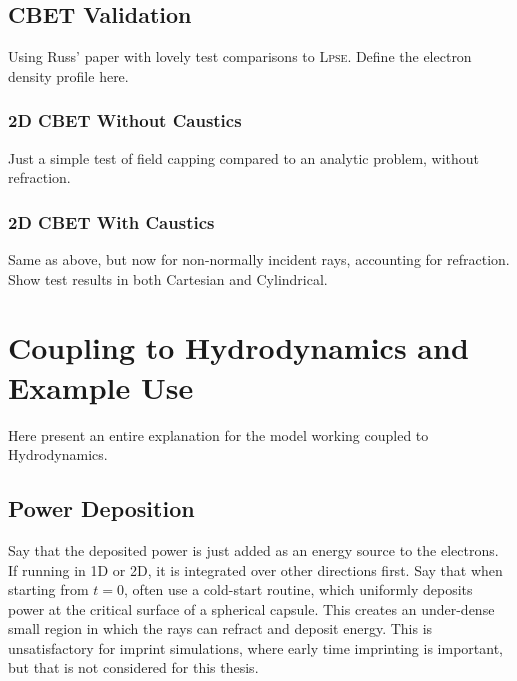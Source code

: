 \subsection{\ac{CBET} Validation}
Using Russ' paper with lovely test comparisons to \textsc{Lpse}.
Define the electron density profile here.

\subsubsection{2D \ac{CBET} Without Caustics}
Just a simple test of field capping compared to an analytic problem, without refraction.

\subsubsection{2D \ac{CBET} With Caustics}%
\label{sec:SOLAS_CBET_caustic_test}
Same as above, but now for non-normally incident rays, accounting for refraction.
Show test results in both Cartesian and Cylindrical.


\section{Coupling to Hydrodynamics and Example Use}

Here present an entire explanation for the model working coupled to Hydrodynamics.

\subsection{Power Deposition}

Say that the deposited power is just added as an energy source to the electrons.
If running in 1D or 2D, it is integrated over other directions first.
Say that when starting from $t=0$, often use a cold-start routine, which uniformly deposits power at the critical surface of a spherical capsule.
This creates an under-dense small region in which the rays can refract and deposit energy.
This is unsatisfactory for imprint simulations, where early time imprinting is important, but that is not considered for this thesis.

